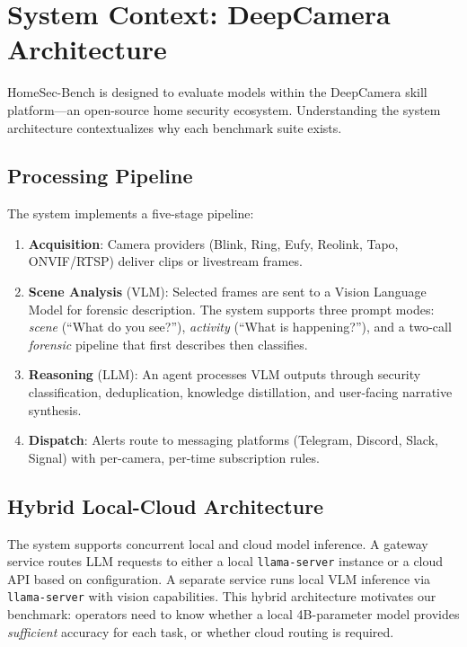 \documentclass[conference]{IEEEtran}
\begin{document}

\section{System Context: DeepCamera Architecture}

HomeSec-Bench is designed to evaluate models within the DeepCamera
skill platform---an open-source home security ecosystem. Understanding
the system architecture contextualizes why each benchmark suite exists.

\subsection{Processing Pipeline}
The system implements a five-stage pipeline:

\begin{enumerate}[nosep]
    \item \textbf{Acquisition}: Camera providers (Blink, Ring, Eufy, Reolink,
    Tapo, ONVIF/RTSP) deliver clips or livestream frames.
    \item \textbf{Scene Analysis} (VLM): Selected frames are sent to a
    Vision Language Model for forensic description. The system supports
    three prompt modes: \emph{scene} (``What do you see?''),
    \emph{activity} (``What is happening?''), and a two-call
    \emph{forensic} pipeline that first describes then classifies.
    \item \textbf{Reasoning} (LLM): An agent processes VLM outputs
    through security classification, deduplication, knowledge
    distillation, and user-facing narrative synthesis.
    \item \textbf{Dispatch}: Alerts route to messaging platforms
    (Telegram, Discord, Slack, Signal) with per-camera, per-time
    subscription rules.
\end{enumerate}

\subsection{Hybrid Local-Cloud Architecture}
The system supports concurrent local and cloud model inference. A
gateway service routes LLM requests to either a local
\texttt{llama-server} instance or a cloud API based on configuration.
A separate service runs local VLM inference via \texttt{llama-server}
with vision capabilities. This hybrid architecture motivates our
benchmark: operators need to know whether a local 4B-parameter model
provides \emph{sufficient} accuracy for each task, or whether cloud
routing is required.
\end{document}
